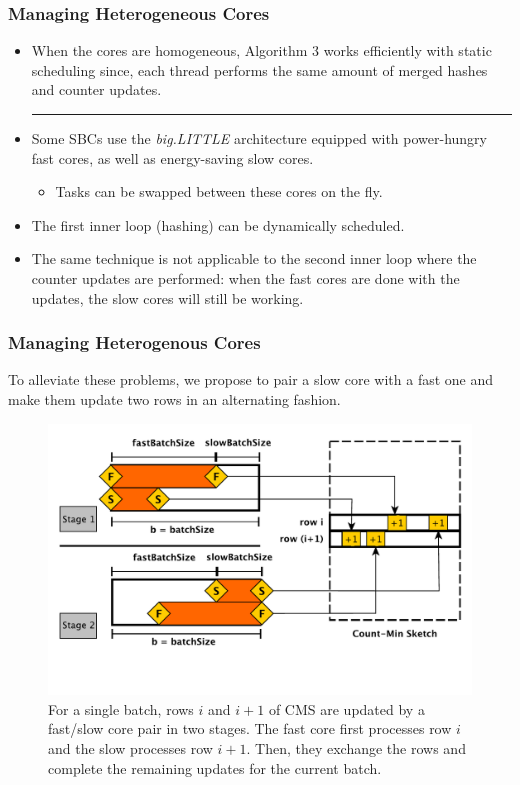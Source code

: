 \documentclass{beamer}
\begin{document}
\begin{frame}
	\frametitle{Managing Heterogeneous Cores}
	\begin{itemize}
		\item When the cores are homogeneous, Algorithm 3 works efficiently with static scheduling since, each thread performs the same amount of merged hashes and counter updates.
		\noindent\rule{10cm}{0.4pt}

		\item Some SBCs use the {\em big.LITTLE} architecture equipped with power-hungry fast cores, as well as energy-saving slow cores.
		\begin{itemize}
		\item Tasks can be swapped between these cores on the fly.
		\end{itemize}
		\item The first inner loop (hashing) can be dynamically  scheduled.
		\item The same technique is not applicable to the second inner loop where the counter updates are performed: when the fast cores are done
		with the updates, the slow cores will still be working.
	\end{itemize}
\end{frame} 

\begin{frame}
		\frametitle{Managing Heterogenous Cores}
		To alleviate these problems, we propose to pair a slow core with a fast one and
		make them update two rows in an alternating fashion.
		
		\begin{figure}[H]
				\includegraphics[scale=0.45]{fastslow.pdf}
				\caption{\small{For a single batch, rows $i$ and $i+1$ of CMS are updated by a fast/slow core pair in two stages. The fast core first processes row $i$ and the slow processes row $i+1$. Then, they exchange the rows and complete the remaining updates for the current batch.}}
				\label{fig:fastslow}
		\end{figure}
\end{frame}
\end{document}
